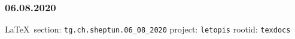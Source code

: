  
 
\subsubsection{06.08.2020}
  
\vspace{0.5cm}
 {\ifDEBUG\small\LaTeX~section: \verb|tg.ch.sheptun.06_08_2020| project: \verb|letopis| rootid: \verb|texdocs|	\fi}
\vspace{0.5cm}
  

